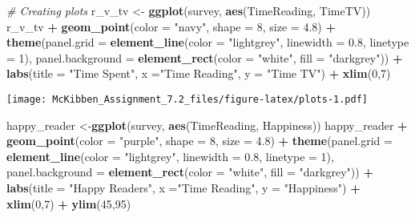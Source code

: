 \documentclass[
]{article}
\newenvironment{Shaded}{\begin{snugshade}}{\end{snugshade}}
\newcommand{\AttributeTok}[1]{\textcolor[rgb]{0.13,0.29,0.53}{#1}}
\newcommand{\CommentTok}[1]{\textcolor[rgb]{0.56,0.35,0.01}{\textit{#1}}}
\newcommand{\DecValTok}[1]{\textcolor[rgb]{0.00,0.00,0.81}{#1}}
\newcommand{\FloatTok}[1]{\textcolor[rgb]{0.00,0.00,0.81}{#1}}
\newcommand{\FunctionTok}[1]{\textcolor[rgb]{0.13,0.29,0.53}{\textbf{#1}}}
\newcommand{\NormalTok}[1]{#1}
\newcommand{\OtherTok}[1]{\textcolor[rgb]{0.56,0.35,0.01}{#1}}
\newcommand{\SpecialCharTok}[1]{\textcolor[rgb]{0.81,0.36,0.00}{\textbf{#1}}}
\newcommand{\StringTok}[1]{\textcolor[rgb]{0.31,0.60,0.02}{#1}}
\begin{document}
\begin{Shaded}
\begin{Highlighting}[]
\CommentTok{\# Creating plots}
\NormalTok{r\_v\_tv }\OtherTok{\textless{}{-}} \FunctionTok{ggplot}\NormalTok{(survey, }\FunctionTok{aes}\NormalTok{(TimeReading, TimeTV))}
\NormalTok{r\_v\_tv }\SpecialCharTok{+} \FunctionTok{geom\_point}\NormalTok{(}\AttributeTok{color =} \StringTok{"navy"}\NormalTok{, }\AttributeTok{shape =} \DecValTok{8}\NormalTok{, }\AttributeTok{size =} \FloatTok{4.8}\NormalTok{) }\SpecialCharTok{+}
  \FunctionTok{theme}\NormalTok{(}\AttributeTok{panel.grid =} \FunctionTok{element\_line}\NormalTok{(}\AttributeTok{color =} \StringTok{"lightgrey"}\NormalTok{, }\AttributeTok{linewidth =} \FloatTok{0.8}\NormalTok{, }\AttributeTok{linetype =} \DecValTok{1}\NormalTok{), }
        \AttributeTok{panel.background =} \FunctionTok{element\_rect}\NormalTok{(}\AttributeTok{color =} \StringTok{"white"}\NormalTok{, }\AttributeTok{fill =} \StringTok{"darkgrey"}\NormalTok{)) }\SpecialCharTok{+}
  \FunctionTok{labs}\NormalTok{(}\AttributeTok{title =} \StringTok{"Time Spent"}\NormalTok{, }\AttributeTok{x =}\StringTok{"Time Reading"}\NormalTok{, }
       \AttributeTok{y =} \StringTok{"Time TV"}\NormalTok{) }\SpecialCharTok{+} \FunctionTok{xlim}\NormalTok{(}\DecValTok{0}\NormalTok{,}\DecValTok{7}\NormalTok{)}
\end{Highlighting}
\end{Shaded}

\texttt{[image: McKibben\_Assignment\_7.2\_files/figure-latex/plots-1.pdf]}

\begin{Shaded}
\begin{Highlighting}[]
\NormalTok{happy\_reader }\OtherTok{\textless{}{-}}\FunctionTok{ggplot}\NormalTok{(survey, }\FunctionTok{aes}\NormalTok{(TimeReading, Happiness))}
\NormalTok{happy\_reader }\SpecialCharTok{+} \FunctionTok{geom\_point}\NormalTok{(}\AttributeTok{color =} \StringTok{"purple"}\NormalTok{, }\AttributeTok{shape =} \DecValTok{8}\NormalTok{, }\AttributeTok{size =} \FloatTok{4.8}\NormalTok{) }\SpecialCharTok{+} 
  \FunctionTok{theme}\NormalTok{(}\AttributeTok{panel.grid =} \FunctionTok{element\_line}\NormalTok{(}\AttributeTok{color =} \StringTok{"lightgrey"}\NormalTok{, }\AttributeTok{linewidth =} \FloatTok{0.8}\NormalTok{, }\AttributeTok{linetype =} \DecValTok{1}\NormalTok{),}
        \AttributeTok{panel.background =} \FunctionTok{element\_rect}\NormalTok{(}\AttributeTok{color =} \StringTok{"white"}\NormalTok{, }\AttributeTok{fill =} \StringTok{"darkgrey"}\NormalTok{)) }\SpecialCharTok{+}
  \FunctionTok{labs}\NormalTok{(}\AttributeTok{title =} \StringTok{"Happy Readers"}\NormalTok{, }\AttributeTok{x =}\StringTok{"Time Reading"}\NormalTok{, }
       \AttributeTok{y =} \StringTok{"Happiness"}\NormalTok{) }\SpecialCharTok{+} \FunctionTok{xlim}\NormalTok{(}\DecValTok{0}\NormalTok{,}\DecValTok{7}\NormalTok{) }\SpecialCharTok{+} \FunctionTok{ylim}\NormalTok{(}\DecValTok{45}\NormalTok{,}\DecValTok{95}\NormalTok{)}
\end{Highlighting}
\end{Shaded}
\end{document}
